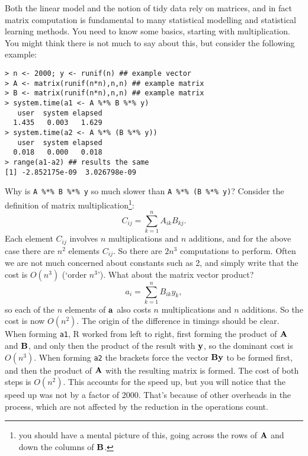 \documentclass[10pt] {article}
\theoremstyle{definition}
\begin{document}
Both the linear model and the notion of tidy data rely on matrices, and in fact matrix computation is fundamental to many statistical modelling and statistical learning methods. You need to know some basics, starting with multiplication. You might think there is not much to say about this, but consider the following example:
\begin{lstlisting}
> n <- 2000; y <- runif(n) ## example vector
> A <- matrix(runif(n*n),n,n) ## example matrix
> B <- matrix(runif(n*n),n,n) ## example matrix
> system.time(a1 <- A %*% B %*% y)
   user  system elapsed 
  1.435   0.003   1.629 
> system.time(a2 <- A %*% (B %*% y))
   user  system elapsed 
  0.018   0.000   0.018 
> range(a1-a2) ## results the same
[1] -2.852175e-09  3.026798e-09
\end{lstlisting}
Why is \lstinline+A %*% B %*% y+ so much slower than \lstinline+A %*% (B %*% y)+? Consider the definition of matrix multiplication\footnote{you should have a mental picture of this, going across the rows of $\bf A$ and down the columns of $\bf B$.  }:
$$
C_{ij} = \sum_{k=1}^n A_{ik}B_{kj}. 
$$
Each element $C_{ij}$ involves $n$ multiplications and $n$ additions, and for the above case there are $n^2$ elements $C_{ij}$. So there are $2n^3$ computations to perform. Often we are not much concerned about constants such as 2, and simply write that the cost is $O(n^3)$ (`order $n^3$'). What about the matrix vector product?
$$
a_i = \sum_{k=1}^n B_{ik} y_k,
$$
so each of the $n$ elements of $\bf a$ also costs $n$ multiplications and $n $ additions. So the cost is now $O(n^2)$. The origin of the difference in timings should be clear. When forming {\tt a1}, R worked from left to right, first forming the product of $\bf A$ and $\bf B$, and only then the product of the result with $\bf y$, so the dominant  cost is $O(n^3)$. When forming {\tt a2} the brackets force the vector ${\bf By}$ to be formed first, and then the product of $\bf A $ with the resulting matrix is formed. The cost of both steps is $O(n^2)$. This accounts for the speed up, but you will notice that the speed up was not by a factor of 2000. That's because of other overheads in the process, which are not affected by the reduction in the operations count.  
\end{document}
